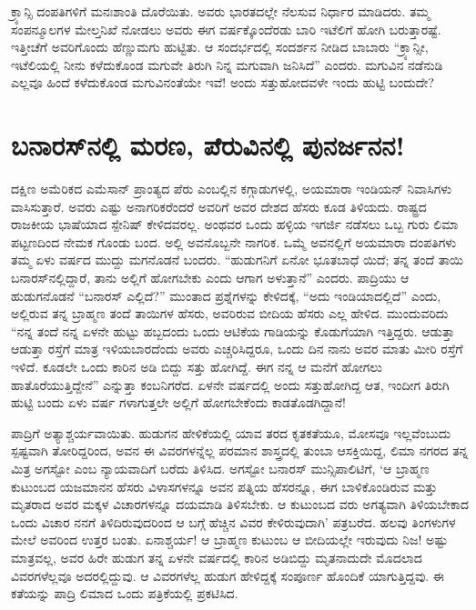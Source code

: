 ಕ್ರ್ಯಾನ್ಸಿ ದಂಪತಿಗಳಿಗೆ ಮನಃಶಾಂತಿ ದೊರೆಯಿತು. ಅವರು ಭಾರತದಲ್ಲೇ ನೆಲಸುವ ನಿರ್ಧಾರ ಮಾಡಿದರು. ತಮ್ಮ ಸಂಪನ್ಮೂಲಗಳ ಮೇಲ್ತನಿಖೆ ನೋಡಲು ಅವರು ಈಗ ವರ್ಷಕ್ಕೊಂದೆರಡು ಬಾರಿ ಇಟೆಲಿಗೆ ಹೋಗಿ ಬರುತ್ತಾರಷ್ಟೆ. ಇತ್ತೀಚೆಗೆ ಅವರಿಗೊಂದು ಹೆಣ್ಣುಮಗು ಹುಟ್ಟಿತು. ಆ ಸಂದರ್ಭದಲ್ಲಿ ಸಂದರ್ಶನ ನೀಡಿದ ಬಾಬಾರು “ಕ್ರ್ಯಾನ್ಸೀ, ಇಟೆಲಿಯಲ್ಲಿ ನೀನು ಕಳೆದುಕೊಂಡ ಮಗುವೇ ತಿರುಗಿ ನಿನ್ನ ಮಗುವಾಗಿ ಜನಿಸಿದೆ” ಎಂದರು. ಮಗುವಿನ ನಡೆನುಡಿ ಎಲ್ಲವೂ ಹಿಂದೆ ಕಳೆದುಕೊಂಡ ಮಗುವಿನಂತೆಯೇ ಇವೆ! ಅಂದು ಸತ್ತುಹೋದವಳೇ ಇಂದು ಹುಟ್ಟಿ ಬಂದುದೇ?


\section{ಬನಾರಸ್​ನಲ್ಲಿ ಮರಣ, ಪೆರುವಿನಲ್ಲಿ ಪುನರ್ಜನನ!}

ದಕ್ಷಿಣ ಅಮೆರಿಕದ ಎಮೆಸಾನ್ ಪ್ರಾಂತ್ಯದ ಪೆರು ಎಂಬಲ್ಲಿನ ಕಗ್ಗಾಡುಗಳಲ್ಲಿ, ಅಯಮಾರಾ ಇಂಡಿಯನ್ ನಿವಾಸಿಗಳು ವಾಸಿಸುತ್ತಾರೆ. ಅವರು ಎಷ್ಟು ಅನಾಗರಿಕರೆಂದರೆ ಅವರಿಗೆ ಅವರ ದೇಶದ ಹೆಸರು ಕೂಡ ತಿಳಿಯದು. ರಾಷ್ಟ್ರದ ರಾಜಕೀಯ ಭಾಷೆಯಾದ ಸ್ಪೇನಿಷ್ ಕೇಳಿದವರಲ್ಲ. ಅಂಥವರ ಒಂದು ಹಳ್ಳಿಯ ಇಗರ್ಜಿ ನಡೆಸಲು ಒಬ್ಬ ಗುರು ಲಿಮಾ ಪಟ್ಟಣದಿಂದ ನೇಮಕ ಗೊಂಡು ಬಂದ. ಅಲ್ಲಿ ಅವನೊಬ್ಬನೇ ನಾಗರಿಕ. ಒಮ್ಮೆ ಅವನಲ್ಲಿಗೆ ಅಯಮಾರಾ ದಂಪತಿಗಳು ತಮ್ಮ ಏಳು ವರ್ಷದ ಮುದ್ದು ಮಗನೊಡನೆ ಬಂದರು. “ಹುಡುಗನಿಗೆ ಏನೋ ಭೂತಬಾಧೆ ಯಿದೆ; ತನ್ನ ತಂದೆ ತಾಯಿ ಬನಾರಸ್​ನಲ್ಲಿದ್ದಾರೆ, ತಾನು ಅಲ್ಲಿಗೆ ಹೋಗಬೇಕು ಎಂದು ಆಗಾಗ ಅಳುತ್ತಾನೆ” ಎಂದರು. ಪಾದ್ರಿಯು ಆ ಹುಡುಗನೊಡನೆ “ಬನಾರಸ್ ಎಲ್ಲಿದೆ?” ಮುಂತಾದ ಪ್ರಶ್ನೆಗಳನ್ನು ಕೇಳಿದಕ್ಕೆ, “ಅದು ಇಂಡಿಯಾದಲ್ಲಿದೆ” ಎಂದು, ಅಲ್ಲಿರುವ ತನ್ನ ಬ್ರಾಹ್ಮಣ ತಂದೆ ತಾಯಿಗಳ ಹೆಸರು, ಅವರಿರುವ ಬೀದಿಯ ಹೆಸರು ಎಲ್ಲ ಹೇಳಿದ. ಮುಂದುವರಿದು “ನನ್ನ ತಂದೆ ನನ್ನ ಏಳನೇ ಹುಟ್ಟು ಹಬ್ಬದಂದು ಒಂದು ಆಟಿಕೆಯ ಗಾಡಿಯನ್ನು ಕೊಡುಗೆಯಾಗಿ ಇತ್ತಿದ್ದರು. ಆಡುತ್ತಾ ಆಡುತ್ತಾ ರಸ್ತೆಗೆ ಮಾತ್ರ ಇಳಿಯಬಾರದೆಂದು ಅವರು ಎಚ್ಚರಿಸಿದ್ದರೂ, ಒಂದು ದಿನ ನಾನು ಅವರ ಮಾತು ಮೀರಿ ರಸ್ತೆಗೆ ಇಳಿದೆ. ಕೂಡಲೇ ಒಂದು ಕಾರಿನ ಅಡಿ ಬಿದ್ದು ಸತ್ತು ಹೋಗಿದ್ದೆ. ಈಗ ನನ್ನ ಆ ಮನೆಗೆ ಹೋಗಲು ಹಾತೊರೆಯುತ್ತಿದ್ದೇನೆ” ಎನ್ನುತ್ತಾ ಕಂಬನಿಗರೆದ. ಏಳನೇ ವರ್ಷದಲ್ಲಿ ಅಂದು ಸತ್ತುಹೋಗಿದ್ದ ಆತ, ಇಂದೀಗ ತಿರುಗಿ ಹುಟ್ಟಿ ಬಂದು ಏಳು ವರ್ಷ ಗಳಾಗುತ್ತಲೇ ಅಲ್ಲಿಗೆ ಹೋಗಬೇಕೆಂದು ಕಾಡತೊಡಗಿದ್ದಾನೆ!

ಪಾದ್ರಿಗೆ ಅತ್ಯಾಶ್ಚರ್ಯವಾಯಿತು. ಹುಡುಗನ ಹೇಳಿಕೆಯಲ್ಲಿ ಯಾವ ತರದ ಕೃತಕತೆಯೂ, ಮೋಸವೂ ಇಲ್ಲವೆಂಬುದು ಸ್ಪಷ್ಟವಾಗಿ ತೋರಿದ್ದರಿಂದ, ಅವನ ಈ ವಿವರಗಳನ್ನೆಲ್ಲ ಪರಮಾನ ಶಾಸ್ತ್ರದಲ್ಲಿ ತುಂಬಾ ಆಸಕ್ತಿಯಿದ್ದ, ಲಿಮಾ ನಗರದ ತನ್ನ ಮಿತ್ರ ಅಗಸ್ಟೋ ಎಂಬ ನ್ಯಾಯವಾದಿಗೆ ಬರೆದು ತಿಳಿಸಿದ. ಅಗಸ್ಟೋ ಬನಾರಸ್ ಮುನ್ಸಿಪಾಲಿಟಿಗೆ, ‘ಆ ಬ್ರಾಹ್ಮಣ ಕುಟುಂಬದ ಯಜಮಾನನ ಹೆಸರು ವಿಳಾಸಗಳನ್ನೂ ಅವನ ಪತ್ನಿಯ ಹೆಸರನ್ನೂ, ಈಗ ಬಾಳಿಕೊಂಡಿರುವ ಮತ್ತು ಮೃತರಾದ ಅವರ ಮಕ್ಕಳ ವಿಚಾರಗಳನ್ನೂ ದಯಮಾಡಿ ತಿಳಿಸಬೇಕು. ಆ ಕುಟುಂಬದ ವರು ಅಗತ್ಯವಾಗಿ ತಿಳಿಯಬೇಕಾದ ಒಂದು ವಿಚಾರ ನನಗೆ ತಿಳಿದಿರುವುದರಿಂದ ಆ ಬಗ್ಗೆ ಹೆಚ್ಚಿನ ವಿವರ ಕೇಳಿರುವುದಾಗಿ’ ಪತ್ರಬರೆದ. ಹಲವು ತಿಂಗಳುಗಳ ಮೇಲೆ ಅವರಿಂದ ಉತ್ತರ ಬಂತು. ಏನಾಶ್ಚರ್ಯ! ಆ ಬ್ರಾಹ್ಮಣ ಕುಟುಂಬ ಆ ಬೀದಿಯಲ್ಲೇ ಇರುವುದು ನಿಜ! ಅಷ್ಟು ಮಾತ್ರವಲ್ಲ, ಅವರ ಹಿರೇ ಹುಡುಗ ತನ್ನ ಏಳನೇ ವರ್ಷದಲ್ಲಿ ಕಾರಿನ ಅಡಿಬಿದ್ದು ಮೃತನಾದುದೇ ಮೊದಲಾದ ವಿವರಗಳೆಲ್ಲವೂ ಅದರಲ್ಲಿದ್ದುವು. ಆ ವಿವರಗಳೆಲ್ಲ ಹುಡುಗ ಹೇಳಿದ್ದಕ್ಕೆ ಸಂಪೂರ್ಣ ಹೊಂದಿಕೆ ಯಾಗುತ್ತಿದ್ದವು. ಈ ಕತೆಯನ್ನು ಪಾದ್ರಿ ಲಿಮಾದ ಒಂದು ಪತ್ರಿಕೆಯಲ್ಲಿ ಪ್ರಕಟಿಸಿದ.

